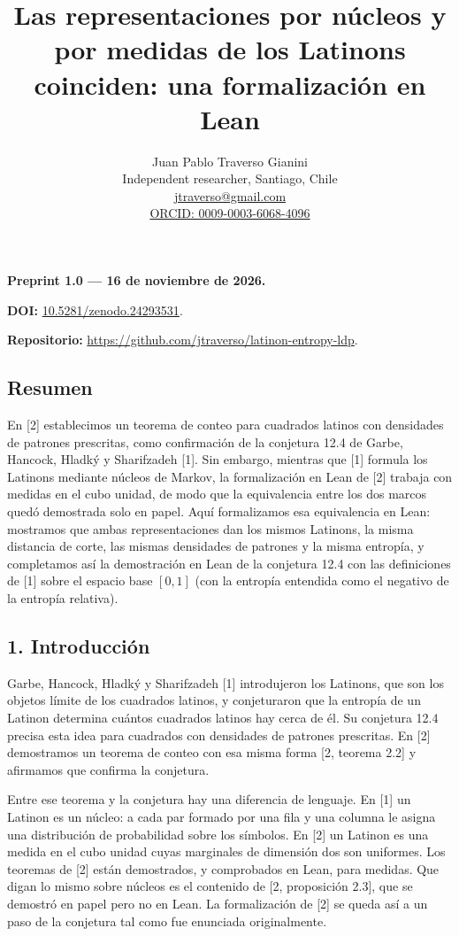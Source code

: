 \documentclass[spanish,11pt,a4paper]{article}
\title{Las representaciones por núcleos y por medidas de los Latinons coinciden: una formalización en Lean}
\author{Juan Pablo Traverso Gianini\\\small Independent researcher, Santiago, Chile\\\small \href{mailto:jtraverso@gmail.com}{jtraverso@gmail.com}\\\small \href{https://orcid.org/0009-0003-6068-4096}{ORCID: 0009-0003-6068-4096}}
\date{}
\begin{document}
\raggedbottom\maketitle
\textbf{Preprint 1.0 --- 16 de noviembre de 2026.}

\textbf{DOI:} \href{https://doi.org/10.5281/zenodo.24293531}{10.5281/zenodo.24293531}.

\textbf{Repositorio:} \url{https://github.com/jtraverso/latinon-entropy-ldp}.

\subsection{Resumen}\label{resumen}

En {[}2{]} establecimos un teorema de conteo para cuadrados latinos con densidades de patrones prescritas, como confirmación de la conjetura 12.4 de Garbe, Hancock, Hladký y Sharifzadeh {[}1{]}. Sin embargo, mientras que {[}1{]} formula los Latinons mediante núcleos de Markov, la formalización en Lean de {[}2{]} trabaja con medidas en el cubo unidad, de modo que la equivalencia entre los dos marcos quedó demostrada solo en papel. Aquí formalizamos esa equivalencia en Lean: mostramos que ambas representaciones dan los mismos Latinons, la misma distancia de corte, las mismas densidades de patrones y la misma entropía, y completamos así la demostración en Lean de la conjetura 12.4 con las definiciones de {[}1{]} sobre el espacio base \([0,1]\) (con la entropía entendida como el negativo de la entropía relativa).

\subsection{1. Introducción}\label{introducciuxf3n}

Garbe, Hancock, Hladký y Sharifzadeh {[}1{]} introdujeron los Latinons, que son los objetos límite de los cuadrados latinos, y conjeturaron que la entropía de un Latinon determina cuántos cuadrados latinos hay cerca de él. Su conjetura 12.4 precisa esta idea para cuadrados con densidades de patrones prescritas. En {[}2{]} demostramos un teorema de conteo con esa misma forma {[}2, teorema 2.2{]} y afirmamos que confirma la conjetura.

Entre ese teorema y la conjetura hay una diferencia de lenguaje. En {[}1{]} un Latinon es un núcleo: a cada par formado por una fila y una columna le asigna una distribución de probabilidad sobre los símbolos. En {[}2{]} un Latinon es una medida en el cubo unidad cuyas marginales de dimensión dos son uniformes. Los teoremas de {[}2{]} están demostrados, y comprobados en Lean, para medidas. Que digan lo mismo sobre núcleos es el contenido de {[}2, proposición 2.3{]}, que se demostró en papel pero no en Lean. La formalización de {[}2{]} se queda así a un paso de la conjetura tal como fue enunciada originalmente.
\end{document}
